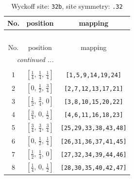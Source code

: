 \documentclass[fleqn,8pt]{jsarticle}
\begin{document}
\begin{longtable}{ccc}
\caption{Wyckoff site: {\tt 32b}, site symmetry: {\tt .32}}
 \\
 \hline \hline
No. & position & mapping \\ \hline \endfirsthead

\multicolumn{2}{l}{\tablename\ \thetable{}} \\
 \hline \hline
No. & position & mapping \\ \hline \endhead

 \hline \hline
\multicolumn{2}{r}{\footnotesize\it continued ...} \\ \endfoot

 \hline \hline
\multicolumn{2}{r}{} \\ \endlastfoot

1 & $\left[ \frac{1}{4},\, \frac{1}{4},\, \frac{1}{4} \right]$ & {\tt [1,5,9,14,19,24]} \\ \hline
2 & $\left[ 0,\, \frac{1}{2},\, \frac{3}{4} \right]$ & {\tt [2,7,12,13,17,21]} \\ \hline
3 & $\left[ \frac{1}{2},\, \frac{3}{4},\, 0 \right]$ & {\tt [3,8,10,15,20,22]} \\ \hline
4 & $\left[ \frac{3}{4},\, 0,\, \frac{1}{2} \right]$ & {\tt [4,6,11,16,18,23]} \\ \hline
5 & $\left[ \frac{3}{4},\, \frac{3}{4},\, \frac{3}{4} \right]$ & {\tt [25,29,33,38,43,48]} \\ \hline
6 & $\left[ 0,\, \frac{1}{2},\, \frac{1}{4} \right]$ & {\tt [26,31,36,37,41,45]} \\ \hline
7 & $\left[ \frac{1}{2},\, \frac{1}{4},\, 0 \right]$ & {\tt [27,32,34,39,44,46]} \\ \hline
8 & $\left[ \frac{1}{4},\, 0,\, \frac{1}{2} \right]$ & {\tt [28,30,35,40,42,47]} \\
\end{longtable}
\renewcommand{\arraystretch}{1.2}
\end{document}
